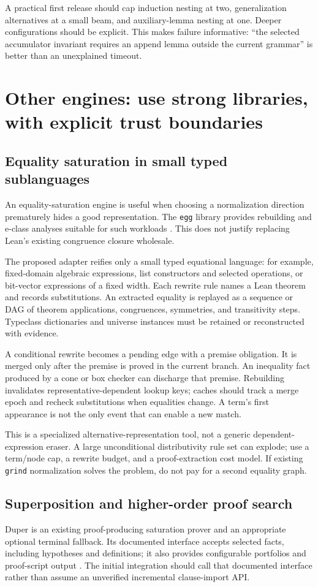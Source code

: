 \documentclass[11pt,a4paper]{article}
\newcommand{\grind}{\texttt{grind}}
\newcommand{\code}[1]{\texttt{#1}}
\begin{document}
A practical first release should cap induction nesting at two, generalization alternatives at a small beam, and auxiliary-lemma nesting at one. Deeper configurations should be explicit. This makes failure informative: ``the selected accumulator invariant requires an append lemma outside the current grammar'' is better than an unexplained timeout.

\section{Other engines: use strong libraries, with explicit trust boundaries}
\subsection{Equality saturation in small typed sublanguages}
An equality-saturation engine is useful when choosing a normalization direction prematurely hides a good representation. The \code{egg} library provides rebuilding and e-class analyses suitable for such workloads \cite{egg}. This does not justify replacing Lean's existing congruence closure wholesale.

The proposed adapter reifies only a small typed equational language: for example, fixed-domain algebraic expressions, list constructors and selected operations, or bit-vector expressions of a fixed width. Each rewrite rule names a Lean theorem and records substitutions. An extracted equality is replayed as a sequence or DAG of theorem applications, congruences, symmetries, and transitivity steps. Typeclass dictionaries and universe instances must be retained or reconstructed with evidence.

A conditional rewrite becomes a pending edge with a premise obligation. It is merged only after the premise is proved in the current branch. An inequality fact produced by a cone or box checker can discharge that premise. Rebuilding invalidates representative-dependent lookup keys; caches should track a merge epoch and recheck substitutions when equalities change. A term's first appearance is not the only event that can enable a new match.

This is a specialized alternative-representation tool, not a generic dependent-expression eraser. A large unconditional distributivity rule set can explode; use a term/node cap, a rewrite budget, and a proof-extraction cost model. If existing \grind{} normalization solves the problem, do not pay for a second equality graph.

\subsection{Superposition and higher-order proof search}
Duper is an existing proof-producing saturation prover and an appropriate optional terminal fallback. Its documented interface accepts selected facts, including hypotheses and definitions; it also provides configurable portfolios and proof-script output \cite{duper}. The initial integration should call that documented interface rather than assume an unverified incremental clause-import API.
\end{document}
